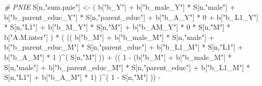 \documentclass[
]{book}
\newenvironment{Shaded}{\begin{snugshade}}{\end{snugshade}}
\newcommand{\CommentTok}[1]{\textcolor[rgb]{0.56,0.35,0.01}{\textit{#1}}}
\newcommand{\DecValTok}[1]{\textcolor[rgb]{0.00,0.00,0.81}{#1}}
\newcommand{\NormalTok}[1]{#1}
\newcommand{\OtherTok}[1]{\textcolor[rgb]{0.56,0.35,0.01}{#1}}
\newcommand{\SpecialCharTok}[1]{\textcolor[rgb]{0.00,0.00,0.00}{#1}}
\newcommand{\StringTok}[1]{\textcolor[rgb]{0.31,0.60,0.02}{#1}}
\begin{document}
\begin{Shaded}
\begin{Highlighting}[]
    \CommentTok{\# PNIE }
\NormalTok{    S[n,}\StringTok{"sum.pnie"}\NormalTok{] }\OtherTok{\textless{}{-}}\NormalTok{ ( b[}\StringTok{"b\_Y"}\NormalTok{] }\SpecialCharTok{+} 
\NormalTok{                           b[}\StringTok{"b\_male\_Y"}\NormalTok{] }\SpecialCharTok{*}\NormalTok{ S[n,}\StringTok{"male"}\NormalTok{] }\SpecialCharTok{+} 
\NormalTok{                           b[}\StringTok{"b\_parent\_educ\_Y"}\NormalTok{] }\SpecialCharTok{*}\NormalTok{ S[n,}\StringTok{"parent\_educ"}\NormalTok{] }\SpecialCharTok{+} 
\NormalTok{                           b[}\StringTok{"b\_A\_Y"}\NormalTok{] }\SpecialCharTok{*} \DecValTok{0} \SpecialCharTok{+} 
\NormalTok{                           b[}\StringTok{"b\_L1\_Y"}\NormalTok{] }\SpecialCharTok{*}\NormalTok{ S[n,}\StringTok{"L1"}\NormalTok{] }\SpecialCharTok{+}
\NormalTok{                           b[}\StringTok{"b\_M\_Y"}\NormalTok{] }\SpecialCharTok{*}\NormalTok{ S[n,}\StringTok{"M"}\NormalTok{] }\SpecialCharTok{+}
\NormalTok{                           b[}\StringTok{"b\_AM\_Y"}\NormalTok{] }\SpecialCharTok{*} \DecValTok{0} \SpecialCharTok{*}\NormalTok{ S[n,}\StringTok{"M"}\NormalTok{] }\SpecialCharTok{*}\NormalTok{ b[}\StringTok{"A.M.inter"}\NormalTok{] ) }\SpecialCharTok{*}
\NormalTok{      ( (( b[}\StringTok{"b\_M"}\NormalTok{] }\SpecialCharTok{+} 
\NormalTok{             b[}\StringTok{"b\_male\_M"}\NormalTok{] }\SpecialCharTok{*}\NormalTok{ S[n,}\StringTok{"male"}\NormalTok{] }\SpecialCharTok{+} 
\NormalTok{             b[}\StringTok{"b\_parent\_educ\_M"}\NormalTok{] }\SpecialCharTok{*}\NormalTok{ S[n,}\StringTok{"parent\_educ"}\NormalTok{] }\SpecialCharTok{+} 
\NormalTok{             b[}\StringTok{"b\_L1\_M"}\NormalTok{] }\SpecialCharTok{*}\NormalTok{ S[n,}\StringTok{"L1"}\NormalTok{] }\SpecialCharTok{+}
\NormalTok{             b[}\StringTok{"b\_A\_M"}\NormalTok{] }\SpecialCharTok{*} \DecValTok{1}\NormalTok{ )}\SpecialCharTok{\^{}}\NormalTok{( S[n,}\StringTok{"M"}\NormalTok{] )) }\SpecialCharTok{+}
\NormalTok{          (( }\DecValTok{1} \SpecialCharTok{{-}}\NormalTok{ (b[}\StringTok{"b\_M"}\NormalTok{] }\SpecialCharTok{+} 
\NormalTok{                    b[}\StringTok{"b\_male\_M"}\NormalTok{] }\SpecialCharTok{*}\NormalTok{ S[n,}\StringTok{"male"}\NormalTok{] }\SpecialCharTok{+} 
\NormalTok{                    b[}\StringTok{"b\_parent\_educ\_M"}\NormalTok{] }\SpecialCharTok{*}\NormalTok{ S[n,}\StringTok{"parent\_educ"}\NormalTok{] }\SpecialCharTok{+} 
\NormalTok{                    b[}\StringTok{"b\_L1\_M"}\NormalTok{] }\SpecialCharTok{*}\NormalTok{ S[n,}\StringTok{"L1"}\NormalTok{] }\SpecialCharTok{+}
\NormalTok{                    b[}\StringTok{"b\_A\_M"}\NormalTok{] }\SpecialCharTok{*} \DecValTok{1}\NormalTok{) )}\SpecialCharTok{\^{}}\NormalTok{( }\DecValTok{1} \SpecialCharTok{{-}}\NormalTok{ S[n,}\StringTok{"M"}\NormalTok{] )) }\SpecialCharTok{{-}}

\end{Highlighting}
\end{Shaded}
\end{document}
